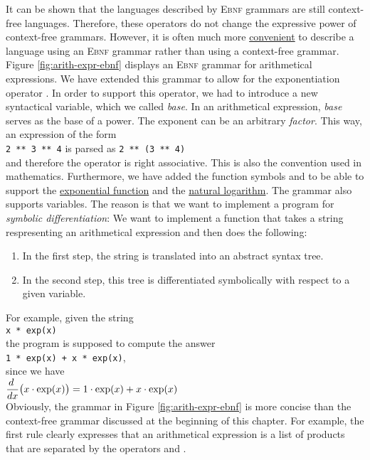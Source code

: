 It can be shown that the languages described by \textsc{Ebnf} grammars are still context-free
languages.  Therefore, these operators do not change the expressive power of context-free 
grammars. 
However, it is often much more \underline{convenient} to describe a language using an \textsc{Ebnf}
grammar rather than using a context-free grammar.  Figure \ref{fig:arith-expr-ebnf}
displays an \textsc{Ebnf} grammar for arithmetical expressions.  We have extended this
grammar to allow for the exponentiation operator \squoted{**}.  In order to support this
operator, we had to introduce a new syntactical variable, which we called \textsl{base}.
In an arithmetical expression, \textsl{base} serves as the base of a power.  The
exponent can be an arbitrary \textsl{factor}.  This way, an expression of the form
\\[0.2cm]
\hspace*{1.3cm}
\texttt{2 ** 3 ** 4}  \quad is parsed as \quad
\texttt{2 ** (3 ** 4)}
\\[0.2cm]
and therefore the operator \squoted{**} is right associative.  This is also the convention used in
mathematics. 
Furthermore, we have added the function symbols  and  to be able to
support the 
\href{http://en.wikipedia.org/wiki/Exponential_function}{exponential function} and the 
\href{http://en.wikipedia.org/wiki/Natural_logarithm}{natural logarithm}.  The grammar also supports
variables.  The reason is that we want to implement a program for \emph{symbolic differentiation}:
We want to implement a function that takes a string respresenting an 
arithmetical expression and then does the following:
\begin{enumerate}
\item In the first step, the string is translated into an abstract syntax tree.
\item In the second step, this tree is differentiated symbolically with respect to
      a given variable.
\end{enumerate}
For example, given the string
\\[0.2cm]
\hspace*{1.3cm}
\texttt{x * exp(x)}
\\[0.2cm]
the program is supposed to compute the answer
\\[0.2cm]
\hspace*{1.3cm}
\texttt{1 * exp(x) + x * exp(x)},
\\[0.2cm]
since we have
\\[0.2cm]
\hspace*{1.3cm}
$\displaystyle\frac{d\;}{dx} \bigl(x \cdot \exp(x)\bigr) = 1 \cdot \exp(x) + x \cdot \exp(x)$
\\[0.2cm]
Obviously, the grammar in Figure \ref{fig:arith-expr-ebnf}  is
more concise than the context-free grammar discussed at the beginning of this chapter.
For example, the first rule clearly expresses that an arithmetical expression is a list of
products that are separated by the operators \squoted{+} and \squoted{-}.


